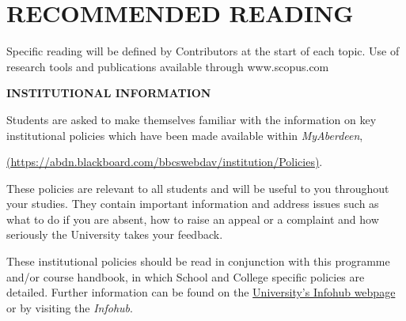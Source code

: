 \documentclass[12pts,a4paper,amsmath,amssymb,floatfix]{article}%
\begin{document}
\section{RECOMMENDED READING}

Specific reading will be defined by Contributors at the start of each topic. Use of research tools
and publications available through www.scopus.com

\bigskip


\begin{center}
{\large {\bf INSTITUTIONAL INFORMATION}}
\end{center}


Students are asked to make themselves familiar with the information on key institutional policies which have been made available within {\it MyAberdeen},
\begin{center}
\href{https://abdn.blackboard.com/bbcswebdav/institution/Policies}{(https://abdn.blackboard.com/bbcswebdav/institution/Policies)}.
\end{center}
These policies are relevant to all students and will be useful to you throughout your studies. They contain important information and address issues such as what to do if you are absent, how to raise an appeal or a complaint and how seriously the University takes your feedback. 
\medskip

These institutional policies should be read in conjunction with this programme and/or course handbook, in which School and College specific policies are detailed. Further information can be found on the \href{http:www.abdn.ac.uk/infohub/}{University's Infohub webpage} or by visiting the {\it Infohub}.

\begin{comment}
\begin{table}[h]
\begin{center}
\begin{tabular}{ c || c | c c c | c }
\hline\hline
\multicolumn{2}{c}{\bf Weeks/Time} & {\bf 10-11h} & {\bf 12-14h} & {\bf 13-14h} & {\bf 15-16h} \\
\hline\hline
\multirow{2}{*}{10-20} & Monday    &             &  $\bullet$   &            &             \\
                       & Tuesday   & $\bullet$   &              &   $\circ$  &             \\
\hline 
\multirow{2}{*}{13-15} & Monday    &             &              &            &   $\otimes$ \\
                       & Thursday  &             &              &            &   $\odot$    \\
\hline
\end{tabular}
\end{center}
\caption{Venues for 2014/15 course: $\bullet$: Cruickshank (Auris Lecture Theatre), $\circ$: St Mary's (G3), $\otimes$: Edward Wright (Comp S84), $\odot$: Zoology (Comp G21).}
\label{table:timetable}
\end{table}
\end{comment}
\end{document}
